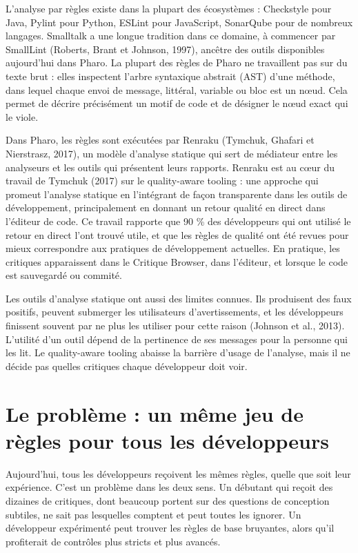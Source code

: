 \documentclass[11pt,a4paper]{report}
\begin{document}
L’analyse par règles existe dans la plupart des écosystèmes : Checkstyle pour Java, Pylint pour Python, ESLint pour JavaScript, SonarQube pour de nombreux langages. Smalltalk a une longue tradition dans ce domaine, à commencer par SmallLint (Roberts, Brant et Johnson, 1997), ancêtre des outils disponibles aujourd’hui dans Pharo. La plupart des règles de Pharo ne travaillent pas sur du texte brut : elles inspectent l’arbre syntaxique abstrait (AST) d’une méthode, dans lequel chaque envoi de message, littéral, variable ou bloc est un nœud. Cela permet de décrire précisément un motif de code et de désigner le nœud exact qui le viole.

Dans Pharo, les règles sont exécutées par Renraku (Tymchuk, Ghafari et Nierstrasz, 2017), un modèle d’analyse statique qui sert de médiateur entre les analyseurs et les outils qui présentent leurs rapports. Renraku est au cœur du travail de Tymchuk (2017) sur le quality-aware tooling : une approche qui promeut l’analyse statique en l’intégrant de façon transparente dans les outils de développement, principalement en donnant un retour qualité en direct dans l’éditeur de code. Ce travail rapporte que 90 \% des développeurs qui ont utilisé le retour en direct l’ont trouvé utile, et que les règles de qualité ont été revues pour mieux correspondre aux pratiques de développement actuelles. En pratique, les critiques apparaissent dans le Critique Browser, dans l’éditeur, et lorsque le code est sauvegardé ou commité.

Les outils d’analyse statique ont aussi des limites connues. Ils produisent des faux positifs, peuvent submerger les utilisateurs d’avertissements, et les développeurs finissent souvent par ne plus les utiliser pour cette raison (Johnson et al., 2013). L’utilité d’un outil dépend de la pertinence de ses messages pour la personne qui les lit. Le quality-aware tooling abaisse la barrière d’usage de l’analyse, mais il ne décide pas quelles critiques chaque développeur doit voir.

\section{Le problème : un même jeu de règles pour tous les développeurs}
Aujourd’hui, tous les développeurs reçoivent les mêmes règles, quelle que soit leur expérience. C’est un problème dans les deux sens. Un débutant qui reçoit des dizaines de critiques, dont beaucoup portent sur des questions de conception subtiles, ne sait pas lesquelles comptent et peut toutes les ignorer. Un développeur expérimenté peut trouver les règles de base bruyantes, alors qu’il profiterait de contrôles plus stricts et plus avancés.
\end{document}
